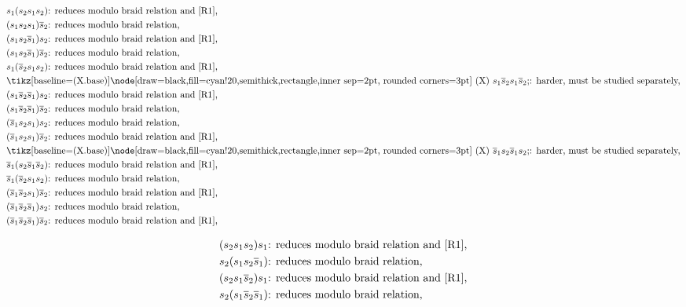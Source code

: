 \documentclass[12pt,reqno]{amsart}
\theoremstyle{definition}
\newcommand{\autour}[1]{\tikz[baseline=(X.base)]\node
  [draw=black,fill=cyan!20,semithick,rectangle,inner sep=2pt,
  rounded corners=3pt] (X) {#1};}
\def\hs{\overline{s}}
\begin{document}
\begin{footnotesize}
\begin{minipage}{.45\textwidth}
\begin{align*}
&s_1 (s_2 s_1 s_2)\text{: reduces modulo braid relation and \eqref{R1},}\\
&(s_1 s_2 s_1) \hs_2\text{: reduces modulo braid relation,}\\
&(s_1 s_2 \hs_1) s_2\text{: reduces modulo braid relation and \eqref{R1},}\\
&(s_1 s_2 \hs_1) \hs_2\text{: reduces modulo braid relation,}\\
&s_1 (\hs_2 s_1 s_2)\text{: reduces modulo braid relation and \eqref{R1},}\\
&\text{\autour{$s_1 \hs_2 s_1 \hs_2$}: harder, must be studied separately,}\\
&(s_1 \hs_2 \hs_1) s_2\text{: reduces modulo braid relation and \eqref{R1},}\\
&(s_1 \hs_2 \hs_1) \hs_2\text{: reduces modulo braid relation,}\\
&(\hs_1 s_2 s_1) s_2\text{: reduces modulo braid relation,}\\
&(\hs_1 s_2 s_1) \hs_2\text{: reduces modulo braid relation and \eqref{R1},}\\
&\text{\autour{$\hs_1 s_2 \hs_1 s_2$}: harder, must be studied separately,}\\
&\hs_1 (s_2 \hs_1 \hs_2)\text{: reduces modulo braid relation and \eqref{R1},}\\
&\hs_1 (\hs_2 s_1 s_2)\text{: reduces modulo braid relation,}\\
&(\hs_1 \hs_2 s_1) \hs_2\text{: reduces modulo braid relation and \eqref{R1},}\\
&(\hs_1 \hs_2 \hs_1) s_2\text{: reduces modulo braid relation,}\\
&(\hs_1 \hs_2 \hs_1) \hs_2\text{: reduces modulo braid relation and \eqref{R1},}
\end{align*}
\end{minipage}
\quad
\begin{minipage}{.45\textwidth}
\begin{align*}
&(s_2 s_1 s_2) s_1\text{: reduces modulo braid relation and \eqref{R1},}\\
&s_2 (s_1 s_2 \hs_1)\text{: reduces modulo braid relation,}\\
&(s_2 s_1 \hs_2) s_1\text{: reduces modulo braid relation and \eqref{R1},}\\
&s_2 (s_1 \hs_2 \hs_1)\text{: reduces modulo braid relation,}\\

\end{align*}
\end{minipage}
\end{footnotesize}
\end{document}
